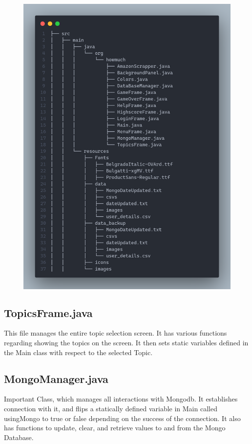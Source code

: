 \documentclass[11pt]{article}
\begin{document}
\begin{figure}[H]
	\centering
	\includegraphics[scale=0.3]{code2.png}
	\caption{}
\end{figure}
\subsection{TopicsFrame.java}
This file manages the entire topic selection screen. It has various functions regarding showing the topics on the screen. It then sets static variables defined in the Main class with respect to the selected Topic. 
\subsection{MongoManager.java}
Important Class, which manages all interactions with Mongodb. It establishes connection with it, and flips a statically defined variable in Main called usingMongo to true or false depending on the success of the connection. It also has functions to update, clear, and retrieve values to and from the Mongo Database. 
\end{document}
